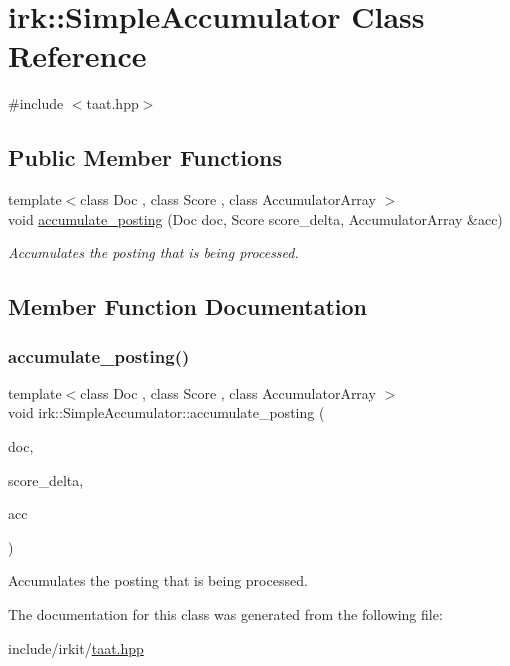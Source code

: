 \hypertarget{classirk_1_1SimpleAccumulator}{}\section{irk\+:\+:Simple\+Accumulator Class Reference}
\label{classirk_1_1SimpleAccumulator}


{\ttfamily \#include $<$taat.\+hpp$>$}

\subsection*{Public Member Functions}
\begin{DoxyCompactItemize}
\item 
{\footnotesize template$<$class Doc , class Score , class Accumulator\+Array $>$ }\\void \mbox{\hyperlink{classirk_1_1SimpleAccumulator_a80f48e1e72fb5819c99b12791198e4c0}{accumulate\+\_\+posting}} (Doc doc, Score score\+\_\+delta, Accumulator\+Array \&acc)
\begin{DoxyCompactList}\small\item\em Accumulates the posting that is being processed. \end{DoxyCompactList}\end{DoxyCompactItemize}


\subsection{Member Function Documentation}
\mbox{\label{classirk_1_1SimpleAccumulator_a80f48e1e72fb5819c99b12791198e4c0}} 
\subsubsection{\texorpdfstring{accumulate\+\_\+posting()}{accumulate\_posting()}}
{\footnotesize\ttfamily template$<$class Doc , class Score , class Accumulator\+Array $>$ \\
void irk\+::\+Simple\+Accumulator\+::accumulate\+\_\+posting (\begin{DoxyParamCaption}\item[{Doc}]{doc,  }\item[{Score}]{score\+\_\+delta,  }\item[{Accumulator\+Array \&}]{acc }\end{DoxyParamCaption})\hspace{0.3cm}{\ttfamily [inline]}}



Accumulates the posting that is being processed. 



The documentation for this class was generated from the following file\+:\begin{DoxyCompactItemize}
\item 
include/irkit/\mbox{\hyperlink{taat_8hpp}{taat.\+hpp}}\end{DoxyCompactItemize}
